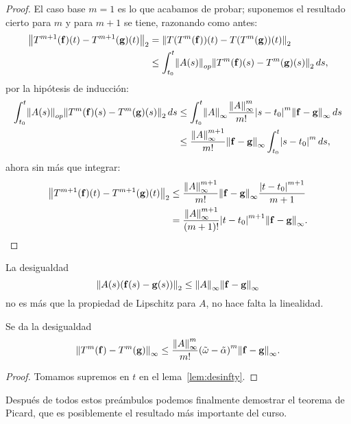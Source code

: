 \documentclass[../ecuaciones_diferenciales.tex]{subfiles}
\begin{document}
\begin{proof}
	El caso base \(m = 1\) es lo que acabamos de probar; suponemos el resultado
    cierto para \(m\) y para \(m + 1\) se tiene, razonando como antes:
	\begin{align*}
		\norm{T^{m + 1}(\vec{f})(t) - T^{m + 1}(\vec{g})(t)}_2
		 & = \norm{T(T^m(\vec{f}))(t) - T(T^m (\vec{g}))(t)}_2 \\
		 & \leq \int_{t_0}^t \norm{A(s)}_{op}
		\norm{T^m(\vec{f})(s) - T^m (\vec{g})(s)}_2 \dif s,
	\end{align*}
	por la hipótesis de inducción:
	\begin{align*}
		\int_{t_0}^t \norm{A(s)}_{op}
		\norm{T^m(\vec{f})(s) - T^m(\vec{g})(s)}_2 \dif s
		 & \leq \int_{t_0}^t \norm{A}_\infty
		\frac{\norm{A}^m_\infty}{m!} \abs{s - t_0}^m
		\norm{\vec{f} - \vec{g}}_\infty \dif s \\
		 & \leq \frac{\norm{A}^{m + 1}_\infty}{m!}
		 \norm{\vec{f} - \vec{g}}_\infty \int_{t_0}^t \abs{s - t_0}^m \dif s,
	\end{align*}
	ahora sin más que integrar:
	\begin{align*}
		\norm{T^{m + 1}(\vec{f})(t) - T^{m + 1}(\vec{g})(t)}_2
		&\leq \frac{\norm{A}^{m + 1}_\infty}{m!}
		 	\norm{\vec{f} - \vec{g}}_\infty \frac{\abs{t - t_0}^{m + 1}}{m + 1}
		\\
		&= \frac{\norm{A}^{m + 1}_\infty}{(m + 1)!} \abs{t - t_0}^{m + 1}
		\norm{\vec{f} - \vec{g}}_\infty.
	\end{align*}
\end{proof}

\begin{remark}
	La desigualdad
	\[\norm{A(s)(\vec{f}(s) - \vec{g}(s))}_2
		\leq \norm{A}_\infty \norm{\vec{f} - \vec{g}}_\infty\]
	no es más que la propiedad de Lipschitz para \(A\),
	no hace falta la linealidad.
\end{remark}

\begin{corollary}\label{cor:T_norm_infty_ineq}
	Se da la desigualdad
	\[\norm{T^m(\vec{f}) - T^m(\vec{g})}_\infty
		\leq \frac{\norm{A}^m_\infty}{m!} {(\tilde{\omega} - \tilde{\alpha})}^m
		\norm{\vec{f} - \vec{g}}_\infty.\]
\end{corollary}

\begin{proof}
	Tomamos supremos en \(t\) en el lema~\ref{lem:desinfty}.
\end{proof}

Después de todos estos preámbulos podemos finalmente demostrar el teorema de
Picard, que es posiblemente el resultado más importante del curso.
\end{document}
